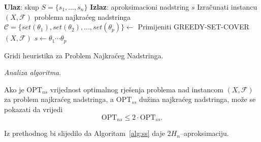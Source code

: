 \documentclass[a4paper, utf8, 11pt, colorlinks]{book}
\begin{document}
  \begin{algorithm}[!t] 
	\begin{algorithmic}[1]
		\STATE \textbf{Ulaz}: skup $S=\{s_1,...,s_n\}$
		\STATE \textbf{Izlaz}: aproksimacioni nadstring $s$
		\STATE Izračunati instancu $(X,\mathcal{F})$ problema najkraćeg nadstringa
		\STATE  $\mathcal{C}=\{set(\theta_1), set(\theta_2),...,set(\theta_p)\}\gets$ Primijeniti GREEDY-SET-COVER$(X,\mathcal{F})$
		\STATE  $s \gets \theta_1 \cdots \theta_p$
	\end{algorithmic}
	\caption{Gridi heuristika za Problem Najkraćeg Nadstringa.}
	\label{alg:ss}
\end{algorithm}

\emph{Analiza algoritma}. 

Ako je $\mathrm{OPT}_{ns}$ vrijednost optimalnog rješenja problema  nad instancom $(X,\mathcal{F})$ za problem  najkraćeg nadstringa, a $\mathrm{OPT}_{ss}$ dužina najkraćeg nadstringa, može se pokazati da vrijedi 
$$\mathrm{OPT}_{ns} \leq 2 \cdot \mathrm{OPT}_{ss}.$$

Iz prethodnog bi slijedilo da Algoritam~\ref{alg:ss} daje $2H_n$--aproksimaciju. 
\end{document}
